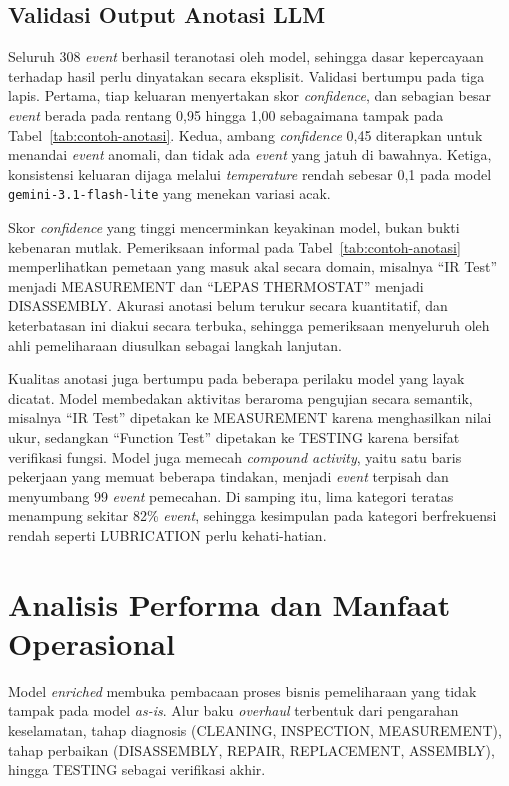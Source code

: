 \subsection{Validasi Output Anotasi LLM}
\label{subsec:validasi-anotasi}

Seluruh 308 \textit{event} berhasil teranotasi oleh model, sehingga dasar kepercayaan terhadap hasil perlu dinyatakan secara eksplisit. Validasi bertumpu pada tiga lapis. Pertama, tiap keluaran menyertakan skor \textit{confidence}, dan sebagian besar \textit{event} berada pada rentang 0,95 hingga 1,00 sebagaimana tampak pada Tabel~\ref{tab:contoh-anotasi}. Kedua, ambang \textit{confidence} 0,45 diterapkan untuk menandai \textit{event} anomali, dan tidak ada \textit{event} yang jatuh di bawahnya. Ketiga, konsistensi keluaran dijaga melalui \textit{temperature} rendah sebesar 0,1 pada model \texttt{gemini-3.1-flash-lite} yang menekan variasi acak.

Skor \textit{confidence} yang tinggi mencerminkan keyakinan model, bukan bukti kebenaran mutlak. Pemeriksaan informal pada Tabel~\ref{tab:contoh-anotasi} memperlihatkan pemetaan yang masuk akal secara domain, misalnya ``IR Test'' menjadi MEASUREMENT dan ``LEPAS THERMOSTAT'' menjadi DISASSEMBLY. Akurasi anotasi belum terukur secara kuantitatif, dan keterbatasan ini diakui secara terbuka, sehingga pemeriksaan menyeluruh oleh ahli pemeliharaan diusulkan sebagai langkah lanjutan.

Kualitas anotasi juga bertumpu pada beberapa perilaku model yang layak dicatat. Model membedakan aktivitas beraroma pengujian secara semantik, misalnya ``IR Test'' dipetakan ke MEASUREMENT karena menghasilkan nilai ukur, sedangkan ``Function Test'' dipetakan ke TESTING karena bersifat verifikasi fungsi. Model juga memecah \textit{compound activity}, yaitu satu baris pekerjaan yang memuat beberapa tindakan, menjadi \textit{event} terpisah dan menyumbang 99 \textit{event} pemecahan. Di samping itu, lima kategori teratas menampung sekitar 82\% \textit{event}, sehingga kesimpulan pada kategori berfrekuensi rendah seperti LUBRICATION perlu kehati-hatian.

\section{Analisis Performa dan Manfaat Operasional}

Model \textit{enriched} membuka pembacaan proses bisnis pemeliharaan yang tidak tampak pada model \textit{as-is}. Alur baku \textit{overhaul} terbentuk dari pengarahan keselamatan, tahap diagnosis (CLEANING, INSPECTION, MEASUREMENT), tahap perbaikan (DISASSEMBLY, REPAIR, REPLACEMENT, ASSEMBLY), hingga TESTING sebagai verifikasi akhir.

